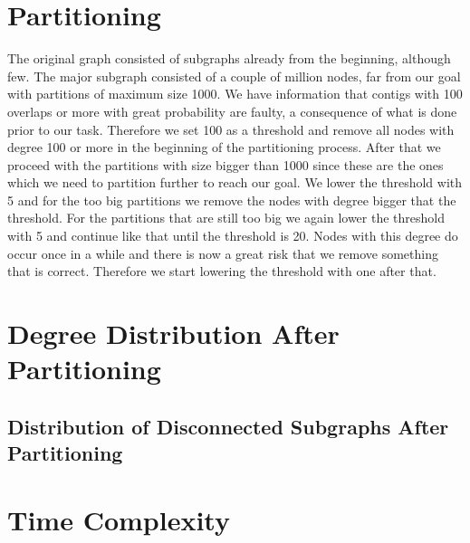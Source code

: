 \documentclass[a4paper,10pt]{article}
\begin{document}
\section{Partitioning}


The original graph consisted of subgraphs already from the beginning, although few. The major subgraph consisted of a couple of million nodes, far from our goal with partitions of maximum size 1000. We have information that contigs with 100 overlaps or more with great probability are faulty, a consequence of what is done prior to our task. Therefore we set 100 as a threshold and remove all nodes with degree 100 or more in the beginning of the partitioning process. After that we proceed with the partitions with size bigger than 1000 since these are the ones which we need to partition further to reach our goal. We lower the threshold with 5 and for the too big partitions we remove the nodes with degree bigger that the threshold. For the partitions that are still too big we again lower the threshold with 5 and continue like that until the threshold is 20. Nodes with this degree do occur once in a while and there is now a great risk that we remove something that is correct. Therefore we start lowering the threshold with one after that.


\section{Degree Distribution After Partitioning}


\subsection{Distribution of Disconnected Subgraphs After Partitioning}


\section{Time Complexity}
\end{document}
